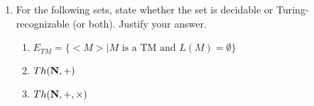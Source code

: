 \documentclass[11pt]{article}
\begin{document}
\begin{enumerate}
\item For the following sets, state whether the set is decidable or Turing-recognizable
	(or both).  Justify your answer.
	\begin{enumerate}
		\itemsep=0pt
		\item $E_{TM} = \{<\!\!\!M\!\!\!> \mid \mbox{$M$ is a TM and $L(M) = \emptyset$}\}$
		\item ${Th}({\bf N}, +)$
		\item ${Th}({\bf N}, +, \times)$			
	\end{enumerate}


\end{enumerate}
\end{document}

